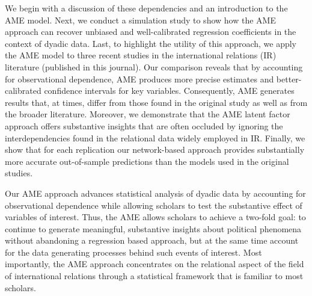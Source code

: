 We begin with a discussion of these dependencies and an introduction to the AME model. Next, we conduct a simulation study to show how the AME approach can recover unbiased and well-calibrated regression coefficients in the context of dyadic data. Last, to highlight the utility of this approach, we apply the AME model to three recent studies in the international relations (IR) literature (published in this journal). Our comparison reveals that by accounting for observational dependence, AME produces more precise estimates and better-calibrated confidence intervals for key variables. Consequently, AME generates results that, at times, differ from those found in the original study as well as from the broader literature. Moreover, we demonstrate that the AME latent factor approach offers substantive insights that are often occluded by ignoring the interdependencies found in the relational data widely employed in IR. Finally, we show that for each replication our network-based approach provides substantially more accurate out-of-sample predictions than the models used in the original studies. 

Our AME approach advances statistical analysis of dyadic data by accounting for observational dependence while allowing scholars to test the substantive effect of variables of interest. Thus, the AME allows scholars to achieve a two-fold goal: to continue to generate meaningful, substantive insights about political phenomena without abandoning a regression based approach, but at the same time account for the data generating processes behind such events of interest. Most importantly, the AME approach concentrates on the relational aspect of the field of international relations through a statistical framework that is familiar to most scholars.